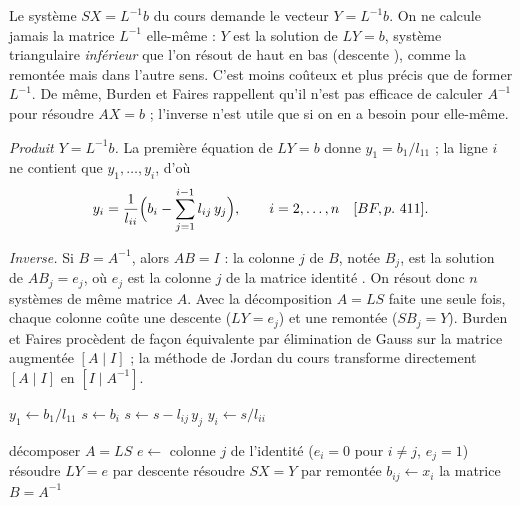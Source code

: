 
\Pourquoi Le système $SX = L^{-1}b$ du cours demande le vecteur $Y = L^{-1}b$.
On ne calcule jamais la matrice $L^{-1}$ elle-même : $Y$ est la solution de
$LY = b$, système triangulaire \emph{inférieur} que l'on résout de haut en bas
(\og descente \fg{}), comme la remontée mais dans l'autre sens. C'est moins
coûteux et plus précis que de former $L^{-1}$. De même, Burden et Faires
rappellent qu'il n'est pas efficace de calculer $A^{-1}$ pour résoudre
$AX = b$  ; l'inverse n'est utile que si on en a besoin pour
elle-même.

\Etapes
{} \emph{Produit $Y = L^{-1}b$.} La première équation de $LY = b$ donne
$y_1 = b_1/l_{11}$ ; la ligne $i$ ne contient que $y_1, \dots, y_i$, d'où
\[
  y_i = \frac{1}{l_{ii}}\Bigl(b_i - \sum_{j=1}^{i-1} l_{ij}\,y_j\Bigr),
  \qquad i = 2, \dots, n \quad [BF, p.~411].
\]

 \emph{Inverse.} Si $B = A^{-1}$, alors $AB = I$ : la colonne $j$ de
$B$, notée $B_j$, est la solution de $AB_j = e_j$, où $e_j$ est la colonne $j$
de la matrice identité . On résout donc $n$ systèmes de même
matrice $A$. Avec la décomposition $A = LS$ faite une seule fois, chaque
colonne coûte une descente ($LY = e_j$) et une remontée ($SB_j = Y$).
Burden et Faires procèdent de façon équivalente par élimination de Gauss sur la
matrice augmentée $[A \mid I]$  ; la méthode de Jordan du cours
transforme directement $[A \mid I]$ en $[I \mid A^{-1}]$.

\begin{algo}[ : descente $Y = L^{-1}b$]
  \State $y_1 \leftarrow b_1/l_{11}$
    \State $s \leftarrow b_i$
     \State $s \leftarrow s - l_{ij}\,y_j$ \EndFor
    \State $y_i \leftarrow s/l_{ii}$
  \EndFor
\end{algo}

\begin{algo}[ : inverse de $A$]
  \State décomposer $A = LS$ 
    \State $e \leftarrow$ colonne $j$ de l'identité ($e_i = 0$ pour $i \ne j$, $e_j = 1$)
    \State résoudre $LY = e$ par descente
    \State résoudre $SX = Y$ par remontée 
     \State $b_{ij} \leftarrow x_i$ \EndFor
  \EndFor
  \Print la matrice $B = A^{-1}$
\end{algo}

